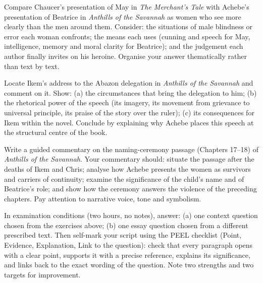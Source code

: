 \documentclass[11pt]{article}
\begin{document}
\begin{exercice}
Compare Chaucer's presentation of May in \emph{The Merchant's Tale} with Achebe's presentation of Beatrice in \emph{Anthills of the Savannah} as women who see more clearly than the men around them. Consider: the situations of male blindness or error each woman confronts; the means each uses (cunning and speech for May, intelligence, memory and moral clarity for Beatrice); and the judgement each author finally invites on his heroine. Organise your answer thematically rather than text by text.
\end{exercice}

\begin{exercice}
Locate Ikem's address to the Abazon delegation in \emph{Anthills of the Savannah} and comment on it. Show: (a) the circumstances that bring the delegation to him; (b) the rhetorical power of the speech (its imagery, its movement from grievance to universal principle, its praise of the story over the ruler); (c) its consequences for Ikem within the novel. Conclude by explaining why Achebe places this speech at the structural centre of the book.
\end{exercice}

\begin{exercice}
Write a guided commentary on the naming-ceremony passage (Chapters 17--18) of \emph{Anthills of the Savannah}. Your commentary should: situate the passage after the deaths of Ikem and Chris; analyse how Achebe presents the women as survivors and carriers of continuity; examine the significance of the child's name and of Beatrice's role; and show how the ceremony answers the violence of the preceding chapters. Pay attention to narrative voice, tone and symbolism.
\end{exercice}

\begin{exercice}
In examination conditions (two hours, no notes), answer: (a) one context question chosen from the exercises above; (b) one essay question chosen from a different prescribed text. Then self-mark your script using the PEEL checklist (Point, Evidence, Explanation, Link to the question): check that every paragraph opens with a clear point, supports it with a precise reference, explains its significance, and links back to the exact wording of the question. Note two strengths and two targets for improvement.
\end{exercice}
\end{document}
